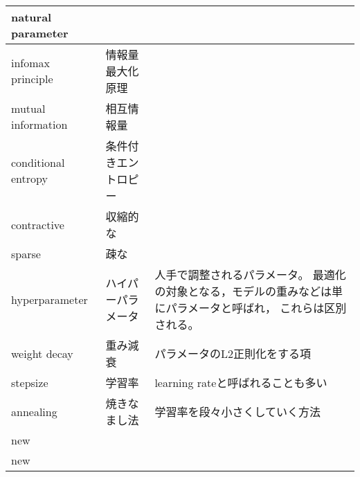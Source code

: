 \documentclass[dvipdfmx, fleqn]{jsarticle}
\begin{document}
\begin{longtable}{lp{4cm}p{7cm}}
        natural parameter
            & 
            & 
            \tabularnewline \hline
        infomax principle
            & 情報量最大化原理
            & 
            \tabularnewline \hline
        mutual information
            & 相互情報量
            & 
            \tabularnewline \hline
        conditional entropy
            & 条件付きエントロピー
            & 
            \tabularnewline \hline
        contractive
            & 収縮的な
            & 
            \tabularnewline \hline
        sparse
            & 疎な
            & 
            \tabularnewline \hline
        hyperparameter
            & ハイパーパラメータ
            & 人手で調整されるパラメータ。
            最適化の対象となる，モデルの重みなどは単にパラメータと呼ばれ，
            これらは区別される。
            \tabularnewline \hline
        weight decay
            & 重み減衰
            & パラメータのL2正則化をする項
            \tabularnewline \hline
        stepsize
            & 学習率
            & learning rateと呼ばれることも多い
            \tabularnewline \hline
        annealing
            & 焼きなまし法
            & 学習率を段々小さくしていく方法
            \tabularnewline \hline
        new
            & 
            & 
            \tabularnewline \hline
        new
            & 
            & 
            \tabularnewline \hline
\end{longtable}
\end{document}
